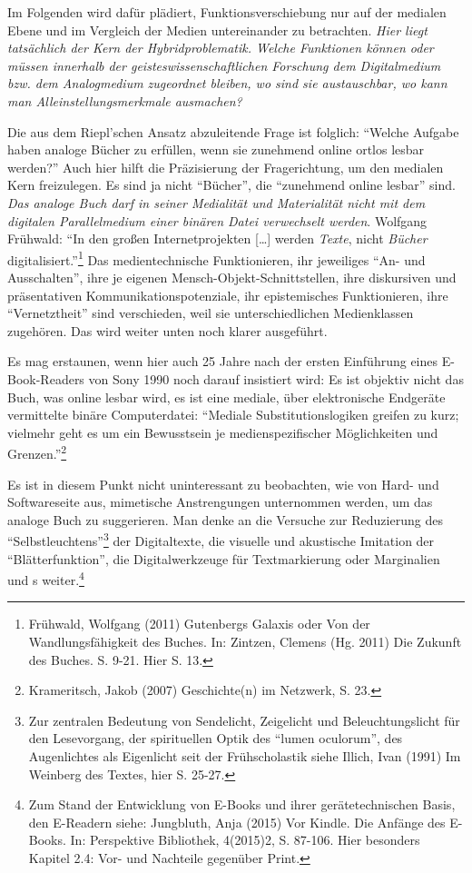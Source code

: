 \documentclass[a4paper,
fontsize=11pt,
oneside,
numbers=noperiodatend,
parskip=half-,
bibliography=totoc,
final
]{scrartcl}
\begin{document}
Im Folgenden wird dafür plädiert, Funktionsverschiebung nur auf der
medialen Ebene und im Vergleich der Medien untereinander zu betrachten.
\emph{Hier liegt tatsächlich der Kern der Hybridproblematik. Welche
Funktionen können oder müssen innerhalb der geisteswissenschaftlichen
Forschung dem Digitalmedium bzw. dem Analogmedium zugeordnet bleiben, wo
sind sie austauschbar, wo kann man Alleinstellungsmerkmale ausmachen?}

Die aus dem Riepl'schen Ansatz abzuleitende Frage ist folglich:
\enquote{Welche Aufgabe haben analoge Bücher zu erfüllen, wenn sie
zunehmend online ortlos lesbar werden?} Auch hier hilft die Präzisierung
der Fragerichtung, um den medialen Kern freizulegen. Es sind ja nicht
\enquote{Bücher}, die \enquote{zunehmend online lesbar} sind. \emph{Das
analoge Buch darf in seiner Medialität und Materialität nicht mit dem
digitalen Parallelmedium einer binären Datei verwechselt werden}.
Wolfgang Frühwald: \enquote{In den großen Internetprojekten
{[}\ldots{}{]} werden \emph{Texte}, nicht \emph{Bücher}
digitalisiert.}\footnote{Frühwald, Wolfgang (2011) Gutenbergs Galaxis
  oder Von der Wandlungsfähigkeit des Buches. In: Zintzen, Clemens (Hg.
  2011) Die Zukunft des Buches. S. 9-21. Hier S. 13.} Das
medientechnische Funktionieren, ihr jeweiliges \enquote{An- und
Ausschalten}, ihre je eigenen Mensch-Objekt-Schnittstellen, ihre
diskursiven und präsentativen Kommunikationspotenziale, ihr
epistemisches Funktionieren, ihre \enquote{Vernetztheit} sind
verschieden, weil sie unterschiedlichen Medienklassen zugehören. Das
wird weiter unten noch klarer ausgeführt.

Es mag erstaunen, wenn hier auch 25 Jahre nach der ersten Einführung
eines E-Book-Readers von Sony 1990 noch darauf insistiert wird: Es ist
objektiv nicht das Buch, was online lesbar wird, es ist eine mediale,
über elektronische Endgeräte vermittelte binäre Computerdatei:
\enquote{Mediale Substitutionslogiken greifen zu kurz; vielmehr geht es
um ein Bewusstsein je medienspezifischer Möglichkeiten und
Grenzen.}\footnote{Krameritsch, Jakob (2007) Geschichte(n) im Netzwerk,
  S. 23.}

Es ist in diesem Punkt nicht uninteressant zu beobachten, wie von Hard-
und Softwareseite aus, mimetische Anstrengungen unternommen werden, um
das analoge Buch zu suggerieren. Man denke an die Versuche zur
Reduzierung des \enquote{Selbstleuchtens}\footnote{Zur zentralen
  Bedeutung von Sendelicht, Zeigelicht und Beleuchtungslicht für den
  Lesevorgang, der spirituellen Optik des \enquote{lumen oculorum}, des
  Augenlichtes als Eigenlicht seit der Frühscholastik siehe Illich, Ivan
  (1991) Im Weinberg des Textes, hier S. 25-27.} der Digitaltexte, die
visuelle und akustische Imitation der \enquote{Blätterfunktion}, die
Digitalwerkzeuge für Textmarkierung oder Marginalien und s
weiter.\footnote{Zum Stand der Entwicklung von E-Books und ihrer
  gerätetechnischen Basis, den E-Readern siehe: Jungbluth, Anja (2015)
  Vor Kindle. Die Anfänge des E-Books. In: Perspektive Bibliothek,
  4(2015)2, S. 87-106. Hier besonders Kapitel 2.4: Vor- und Nachteile
  gegenüber Print.}
\end{document}
